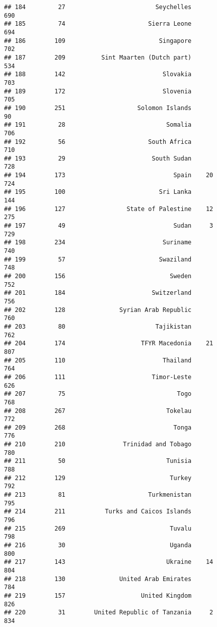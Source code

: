 \documentclass[]{article}
\begin{document}
\begin{verbatim}
## 184         27                         Seychelles                690
## 185         74                       Sierra Leone                694
## 186        109                          Singapore                702
## 187        209          Sint Maarten (Dutch part)                534
## 188        142                           Slovakia                703
## 189        172                           Slovenia                705
## 190        251                    Solomon Islands                 90
## 191         28                            Somalia                706
## 192         56                       South Africa                710
## 193         29                        South Sudan                728
## 194        173                              Spain    20          724
## 195        100                          Sri Lanka                144
## 196        127                 State of Palestine    12          275
## 197         49                              Sudan     3          729
## 198        234                           Suriname                740
## 199         57                          Swaziland                748
## 200        156                             Sweden                752
## 201        184                        Switzerland                756
## 202        128               Syrian Arab Republic                760
## 203         80                         Tajikistan                762
## 204        174                     TFYR Macedonia    21          807
## 205        110                           Thailand                764
## 206        111                        Timor-Leste                626
## 207         75                               Togo                768
## 208        267                            Tokelau                772
## 209        268                              Tonga                776
## 210        210                Trinidad and Tobago                780
## 211         50                            Tunisia                788
## 212        129                             Turkey                792
## 213         81                       Turkmenistan                795
## 214        211           Turks and Caicos Islands                796
## 215        269                             Tuvalu                798
## 216         30                             Uganda                800
## 217        143                            Ukraine    14          804
## 218        130               United Arab Emirates                784
## 219        157                     United Kingdom                826
## 220         31        United Republic of Tanzania     2          834

\end{verbatim}
\end{document}
